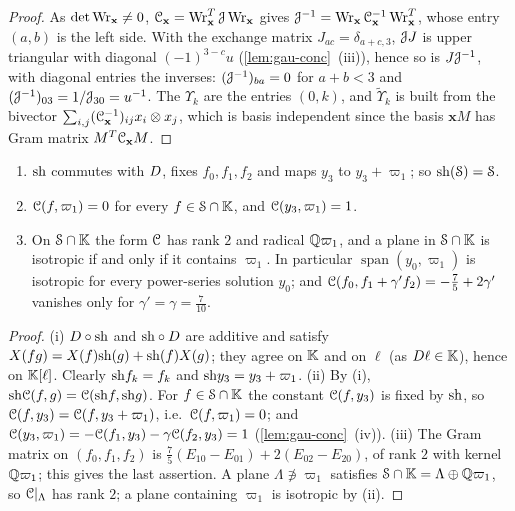 \begin{proof}
As $\det\operatorname{Wr}_{\mathbf x}\neq0$, $\mathcal{C}_{\mathbf x}=\operatorname{Wr}_{\mathbf x}^T\mathcal{J}\operatorname{Wr}_{\mathbf x}$ gives $\mathcal{J}^{-1}=\operatorname{Wr}_{\mathbf x}\mathcal{C}_{\mathbf x}^{-1}\operatorname{Wr}_{\mathbf x}^T$, whose entry $(a,b)$ is the left side. With the exchange matrix $J_{ac}=\delta_{a+c,3}$, $\mathcal{J} J$ is upper triangular with diagonal $(-1)^{3-c}u$ (\cref{lem:gau-conc}~(iii)), hence so is $J\mathcal{J}^{-1}$, with diagonal entries the inverses: $(\mathcal{J}^{-1})_{ba}=0$ for $a+b<3$ and $(\mathcal{J}^{-1})_{03}=1/\mathcal{J}_{30}=u^{-1}$. The $\Upsilon_k$ are the entries $(0,k)$, and $\widetilde\Upsilon_k$ is built from the bivector $\sum_{i,j}(\mathcal{C}_{\mathbf x}^{-1})_{ij}x_i\otimes x_j$, which is basis independent since the basis $\mathbf xM$ has Gram matrix $M^T\mathcal{C}_{\mathbf x}M$.
\end{proof}

\begin{lem}
\label{lem:gau-iso}
\begin{enumerate}
\item $\mathrm{sh}$ commutes with $D$, fixes $f_0,f_1,f_2$ and maps $y_3$ to $y_3+\varpi_1$; so $\mathrm{sh}(\mathcal S)=\mathcal S$.
\item $\mathcal{C}(f,\varpi_1)=0$ for every $f\in\mathcal S\cap\mathbb{K}$, and $\mathcal{C}(y_3,\varpi_1)=1$.
\item On $\mathcal S\cap\mathbb{K}$ the form $\mathcal{C}$ has rank $2$ and radical $\mathbb{Q}\varpi_1$, and a plane in $\mathcal S\cap\mathbb{K}$ is isotropic if and only if it contains $\varpi_1$. In particular $\operatorname{span}(y_0,\varpi_1)$ is isotropic for every power-series solution $y_0$; and $\mathcal{C}(f_0,f_1+\gamma'f_2)=-\frac75+2\gamma'$ vanishes only for $\gamma'=\gamma=\frac7{10}$.
\end{enumerate}
\end{lem}

\begin{proof}
(i) $D\circ\mathrm{sh}$ and $\mathrm{sh}\circ D$ are additive and satisfy $X(fg)=X(f)\mathrm{sh}(g)+\mathrm{sh}(f)X(g)$; they agree on $\mathbb{K}$ and on $\ell$ (as $D\ell\in\mathbb{K}$), hence on $\mathbb{K}[\ell]$. Clearly $\mathrm{sh} f_k=f_k$ and $\mathrm{sh} y_3=y_3+\varpi_1$. (ii) By (i), $\mathrm{sh}\mathcal{C}(f,g)=\mathcal{C}(\mathrm{sh} f,\mathrm{sh} g)$. For $f\in\mathcal S\cap\mathbb{K}$ the constant $\mathcal{C}(f,y_3)$ is fixed by $\mathrm{sh}$, so $\mathcal{C}(f,y_3)=\mathcal{C}(f,y_3+\varpi_1)$, i.e.\ $\mathcal{C}(f,\varpi_1)=0$; and $\mathcal{C}(y_3,\varpi_1)=-\mathcal{C}(f_1,y_3)-\gamma\mathcal{C}(f_2,y_3)=1$ (\cref{lem:gau-conc}~(iv)). (iii) The Gram matrix on $(f_0,f_1,f_2)$ is $\frac75(E_{10}-E_{01})+2(E_{02}-E_{20})$, of rank $2$ with kernel $\mathbb{Q}\varpi_1$; this gives the last assertion. A plane $\Lambda\not\ni\varpi_1$ satisfies $\mathcal S\cap\mathbb{K}=\Lambda\oplus\mathbb{Q}\varpi_1$, so $\mathcal{C}|_\Lambda$ has rank $2$; a plane containing $\varpi_1$ is isotropic by (ii).
\end{proof}

